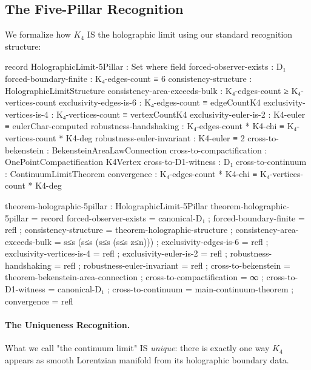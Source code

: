 \documentclass[11pt,a4paper]{book}
\begin{document}
\subsection{The Five-Pillar Recognition}

We formalize how $K_4$ IS the holographic limit using our standard recognition structure:

\begin{code}
record HolographicLimit-5Pillar : Set where
  field
    forced-observer-exists        : D₁
    forced-boundary-finite        : K₄-edges-count ≡ 6
    consistency-structure         : HolographicLimitStructure
    consistency-area-exceeds-bulk : K₄-edges-count ≥ K₄-vertices-count
    exclusivity-edges-is-6        : K₄-edges-count ≡ edgeCountK4
    exclusivity-vertices-is-4     : K₄-vertices-count ≡ vertexCountK4
    exclusivity-euler-is-2        : K4-euler ≡ eulerChar-computed
    robustness-handshaking        : K₄-edges-count * K4-chi ≡ K₄-vertices-count * K4-deg
    robustness-euler-invariant    : K4-euler ≡ 2
    cross-to-bekenstein           : BekensteinAreaLawConnection
    cross-to-compactification     : OnePointCompactification K4Vertex
    cross-to-D1-witness           : D₁
    cross-to-continuum            : ContinuumLimitTheorem
    convergence                   : K₄-edges-count * K4-chi ≡ K₄-vertices-count * K4-deg

theorem-holographic-5pillar : HolographicLimit-5Pillar
theorem-holographic-5pillar = record
  { forced-observer-exists        = canonical-D₁
  ; forced-boundary-finite        = refl
  ; consistency-structure         = theorem-holographic-structure
  ; consistency-area-exceeds-bulk = s≤s (s≤s (s≤s (s≤s z≤n)))
  ; exclusivity-edges-is-6        = refl
  ; exclusivity-vertices-is-4     = refl
  ; exclusivity-euler-is-2        = refl
  ; robustness-handshaking        = refl
  ; robustness-euler-invariant    = refl
  ; cross-to-bekenstein           = theorem-bekenstein-area-connection
  ; cross-to-compactification     = ∞
  ; cross-to-D1-witness           = canonical-D₁
  ; cross-to-continuum            = main-continuum-theorem
  ; convergence                   = refl
  }
\end{code}

\paragraph{The Uniqueness Recognition.}

What we call "the continuum limit" IS \emph{unique}: there is exactly one way $K_4$ appears as 
smooth Lorentzian manifold from its holographic boundary data. 
\end{document}
